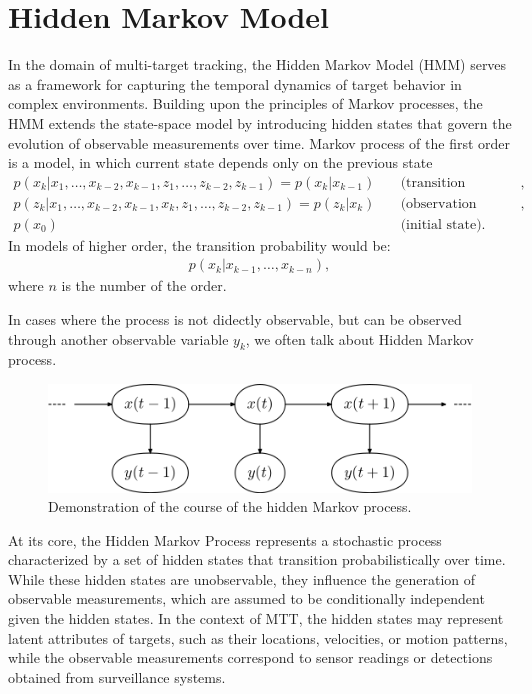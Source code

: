     \section{Hidden Markov Model}
In the domain of multi-target tracking, the Hidden Markov Model (HMM) serves as a framework for
capturing the temporal dynamics of target behavior in complex environments. Building upon the principles of Markov
processes, the HMM extends the state-space model by introducing hidden states that govern the evolution of observable
measurements over time. Markov process of the first order is a model, in which current state depends only on the
previous state
\begin{align}
    p(x_k|x_1,\dots,x_{k-2},x_{k-1}, z_1, \dots, z_{k-2}, z_{k-1}) = p(x_k|x_{k-1}) &\quad \text{(transition
    probability)}, \\
    p(z_k|x_1,\dots,x_{k-2},x_{k-1}, x_k, z_1, \dots, z_{k-2}, z_{k-1}) = p(z_k|x_{k}) &\quad \text{(observation
    likelihood)}, \\
    p(x_0)& \quad \text{(initial state)}.
\end{align}
In models of higher order, the transition probability would be:
\begin{align}
    p(x_k|x_{k-1},\dots,x_{k-n}),
\end{align}
where $n$ is the number of the order.

In cases where the process is not didectly observable, but can be observed through another observable variable $y_k$,
we often talk about Hidden Markov process.
\begin{figure}[h]
    \centering
    \label{fig:hmm}
    \includegraphics[width=13cm]{./text/chapter_01/imgs/hmm}
    \caption{Demonstration of the course of the hidden Markov process.}
\end{figure}

At its core, the Hidden Markov Process represents a stochastic process characterized by a set of hidden states that transition probabilistically over time. While these hidden states are unobservable, they influence the generation of observable measurements, which are assumed to be conditionally independent given the hidden states. In the context of MTT, the hidden states may represent latent attributes of targets, such as their locations, velocities, or motion patterns, while the observable measurements correspond to sensor readings or detections obtained from surveillance systems.

